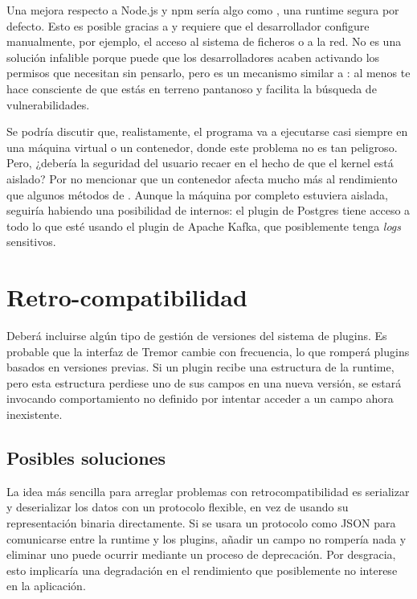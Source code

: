 Una mejora respecto a Node.js y npm sería algo como , una runtime
segura por defecto. Esto es posible gracias a \sandboxing y requiere que el
desarrollador configure manualmente, por ejemplo, el acceso al sistema de
ficheros o a la red. No es una solución infalible porque puede que los
desarrolladores acaben activando los permisos que necesitan sin pensarlo, pero
es un mecanismo similar a \unsafe: al menos te hace consciente de que estás en
terreno pantanoso y facilita la búsqueda de vulnerabilidades.

Se podría discutir que, realistamente, el programa va a ejecutarse casi siempre
en una máquina virtual o un contenedor, donde este problema no es tan peligroso.
Pero, ¿debería la seguridad del usuario recaer en el hecho de que el kernel está
aislado? Por no mencionar que un contenedor afecta mucho más al rendimiento que
algunos métodos de \sandboxing. Aunque la máquina por completo estuviera
aislada, seguiría habiendo una posibilidad de \leaks internos: el plugin de
Postgres tiene acceso a todo lo que esté usando el plugin de Apache Kafka, que
posiblemente tenga \emph{logs} sensitivos.

\section{Retro-compatibilidad}\label{sec:compat}

Deberá incluirse algún tipo de gestión de versiones del sistema de plugins. Es
probable que la interfaz de Tremor cambie con frecuencia, lo que romperá plugins
basados en versiones previas. Si un plugin recibe una estructura de la runtime,
pero esta estructura perdiese uno de sus campos en una nueva versión, se estará
invocando comportamiento no definido por intentar acceder a un campo ahora
inexistente.

\subsection{Posibles soluciones}

La idea más sencilla para arreglar problemas con retrocompatibilidad es
serializar y deserializar los datos con un protocolo flexible, en vez de usando
su representación binaria directamente. Si se usara un protocolo como JSON para
comunicarse entre la runtime y los plugins, añadir un campo no rompería nada y
eliminar uno puede ocurrir mediante un proceso de deprecación. Por desgracia,
esto implicaría una degradación en el rendimiento que posiblemente no interese
en la aplicación.

